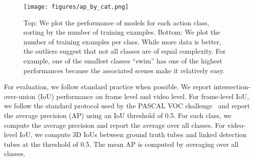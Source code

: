\documentclass[10pt,twocolumn,letterpaper]{article}
\begin{document}
\begin{figure*}[tb]
\centering
\texttt{[image: figures/ap\_by\_cat.png]}
\caption{Top: We plot the performance of models for each action class, sorting by the number of training examples. Bottom: We plot the number of training examples per class. While more data is better, the outliers suggest that not all classes are of equal complexity.  For example, one of the smallest classes ``swim'' has one of the highest performances because the associated scenes make it relatively easy.}
\label{fig:data_vs_ap}
\vspace{-1em}
\end{figure*}

 For evaluation, we follow standard practice when possible. We report intersection-over-union (IoU) performance on frame level and video level. For frame-level IoU, we follow the standard protocol used by the PASCAL VOC challenge~\cite{PASCAL} and report the average precision (AP) using an IoU threshold of 0.5. For each class, we compute the average precision and report the average over all classes. For video-level IoU, we compute 3D IoUs between ground truth tubes and linked detection tubes at the threshold of 0.5. The mean AP is computed by averaging over all classes.
\end{document}

